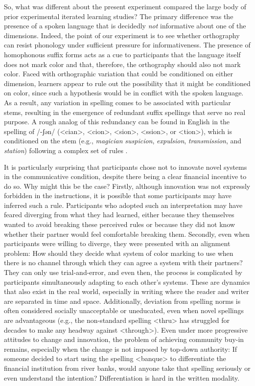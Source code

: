 \documentclass[doc,biblatex]{apa7}
\begin{document}
So, what was different about the present experiment compared the large body of prior experimental iterated learning studies? The primary difference was the presence of a spoken language that is decidedly \textit{not} informative about one of the dimensions. Indeed, the point of our experiment is to see whether orthography can resist phonology under sufficient pressure for informativeness. The presence of homophonous suffix forms acts as a cue to participants that the language itself does not mark color and that, therefore, the orthography should also not mark color. Faced with orthographic variation that could be conditioned on either dimension, learners appear to rule out the possibility that it might be conditioned on color, since such a hypothesis would be in conflict with the spoken language. As a result, any variation in spelling comes to be associated with particular stems, resulting in the emergence of redundant suffix spellings that serve no real purpose. A rough analog of this redundancy can be found in English in the spelling of /-ʃən/ (<cian>, <cion>, <sion>, <ssion>, or <tion>), which is conditioned on the stem (e.g., \textit{magician} \textit{suspicion}, \textit{expulsion}, \textit{transmission}, and \textit{station}) following a complex set of rules \parencite[pp.~420--421]{Carney:1994}.

It is particularly surprising that participants chose not to innovate novel systems in the communicative condition, despite there being a clear financial incentive to do so. Why might this be the case? Firstly, although innovation was not expressly forbidden in the instructions, it is possible that some participants may have inferred such a rule. Participants who adopted such an interpretation may have feared diverging from what they had learned, either because they themselves wanted to avoid breaking these perceived rules or because they did not know whether their partner would feel comfortable breaking them. Secondly, even when participants were willing to diverge, they were presented with an alignment problem: How should they decide what system of color marking to use when there is no channel through which they can agree a system with their partners? They can only use trial-and-error, and even then, the process is complicated by participants simultaneously adapting to each other's systems. These are dynamics that also exist in the real world, especially in writing where the reader and writer are separated in time and space. Additionally, deviation from spelling norms is often considered socially unacceptable or uneducated, even when novel spellings are advantageous (e.g., the non-standard spelling <thru> has struggled for decades to make any headway against <through>). Even under more progressive attitudes to change and innovation, the problem of achieving community buy-in remains, especially when the change is not imposed by top-down authority: If someone decided to start using the spelling <banque> to differentiate the financial institution from river banks, would anyone take that spelling seriously or even understand the intention? Differentiation is hard in the written modality.
\end{document}
